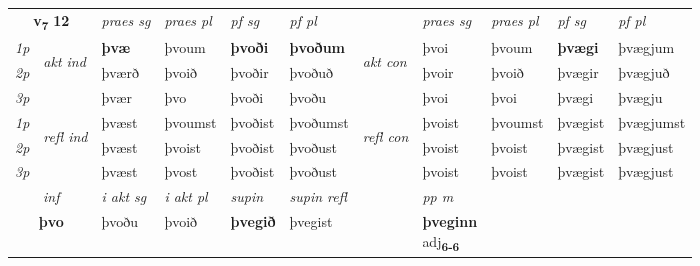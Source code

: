 \noindent
\begin{tabular}{lllllllllll} \toprule
\multicolumn{2}{c}{\textbf{v{\textsubscript{7}}} \Large{\textbf{12}}}  &  \textit{praes sg}  & \textit{praes pl}  &\textit{ pf sg} & \textit{pf pl} &  &  \textit{praes sg}  & \textit{praes pl}  & \textit{pf sg} & \textit{pf pl } \\*
	\cmidrule{3-6} \cmidrule{8-11}
 {\textit{1p}} & \multirow{3}{*}{\begin{turn}{90}\textit{akt ind}\end{turn}} & \textbf{þvæ} & þvoum & \textbf{þvoði} & \textbf{þvoðum} & \multirow{3}{*}{\begin{turn}{90}\textit{akt con}\end{turn}} &þvoi & þvoum & \textbf{þvægi} & þvægjum\\*
 {\textit{2p}} &  &  þværð  & þvoið & þvoðir & þvoðuð & & þvoir & þvoið & þvægir & þvægjuð \\*
{\textit{3p}} &  & þvær & þvo & þvoði & þvoðu & & þvoi & þvoi& þvægi & þvægju \\*
\cmidrule{3-6} \cmidrule{8-11}
 {\textit{1p}} & \multirow{3}{*}{\begin{turn}{90}\textit{refl ind}\end{turn}}  & þvæst & þvoumst & þvoðist & þvoðumst & \multirow{3}{*}{\begin{turn}{90}\textit{refl con}\end{turn}}  &þvoist & þvoumst & þvægist & þvægjumst \\*
 {\textit{2p}} &  & þvæst & þvoist & þvoðist & þvoðust & &þvoist & þvoist & þvægist & þvægjust \\*
 {\textit{3p}}  & & þvæst & þvost & þvoðist & þvoðust & & þvoist & þvoist& þvægist & þvægjust \\*
\cmidrule{3-6} \cmidrule{8-11}

   \multicolumn{2}{c}{\textit{inf}}  & \textit{i akt sg} & \textit{i akt pl}    & \textit{supin} & \textit{supin refl} && \textit{pp m} \\*
  \multicolumn{2}{c}{\textbf{þvo}} & þvoðu  & þvoið    &  \textbf{þvegið} & þvegist && \specialcell{\textbf{þveginn} \\ adj\textbf{\textsubscript{6-6}}} \\*
\end{tabular}

